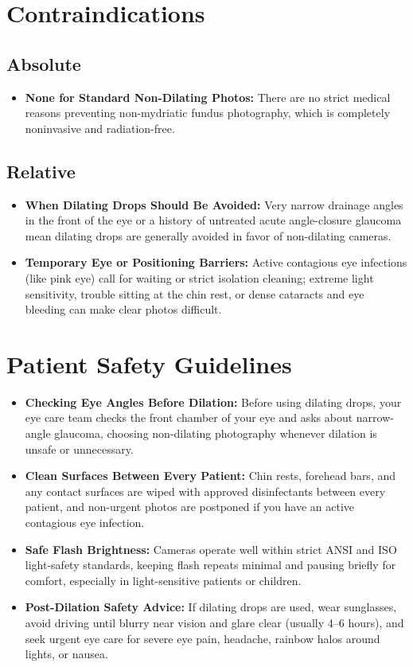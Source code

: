 \section{Contraindications}

\subsection{Absolute}

\begin{itemize}
    \item \textbf{None for Standard Non-Dilating Photos:} There are no strict medical reasons preventing non-mydriatic fundus photography, which is completely noninvasive and radiation-free.
\end{itemize}

\subsection{Relative}

\begin{itemize}
    \item \textbf{When Dilating Drops Should Be Avoided:} Very narrow drainage angles in the front of the eye or a history of untreated acute angle-closure glaucoma mean dilating drops are generally avoided in favor of non-dilating cameras.
    \item \textbf{Temporary Eye or Positioning Barriers:} Active contagious eye infections (like pink eye) call for waiting or strict isolation cleaning; extreme light sensitivity, trouble sitting at the chin rest, or dense cataracts and eye bleeding can make clear photos difficult.
\end{itemize}

\section{Patient Safety Guidelines}

\begin{itemize}
    \item \textbf{Checking Eye Angles Before Dilation:} Before using dilating drops, your eye care team checks the front chamber of your eye and asks about narrow-angle glaucoma, choosing non-dilating photography whenever dilation is unsafe or unnecessary.
    \item \textbf{Clean Surfaces Between Every Patient:} Chin rests, forehead bars, and any contact surfaces are wiped with approved disinfectants between every patient, and non-urgent photos are postponed if you have an active contagious eye infection.
    \item \textbf{Safe Flash Brightness:} Cameras operate well within strict ANSI and ISO light-safety standards, keeping flash repeats minimal and pausing briefly for comfort, especially in light-sensitive patients or children.
    \item \textbf{Post-Dilation Safety Advice:} If dilating drops are used, wear sunglasses, avoid driving until blurry near vision and glare clear (usually 4--6 hours), and seek urgent eye care for severe eye pain, headache, rainbow halos around lights, or nausea.
\end{itemize}

